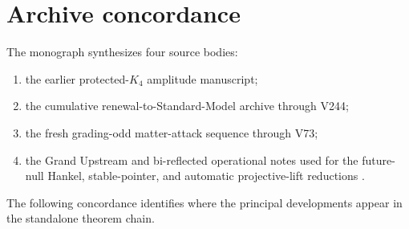 \documentclass[11pt,oneside,openany]{book}
\numberwithin{equation}{chapter}
\theoremstyle{definition}
\theoremstyle{remark}
\begin{document}
\chapter{Archive concordance}
\label{app:concordance}

The monograph synthesizes four source bodies:

\begin{enumerate}[label=\textup{(\roman*)},leftmargin=2.2em]
\item the earlier protected-\(K_4\) amplitude manuscript;
\item the cumulative renewal-to-Standard-Model archive through V244;
\item the fresh grading-odd matter-attack sequence through V73;
\item the Grand Upstream and bi-reflected operational notes used for the
      future-null Hankel, stable-pointer, and automatic projective-lift
      reductions \cite{PelissierMatterAttackV73,GrandUpstreamV045,UniversalPortV044}.
\end{enumerate}

The following concordance identifies where the principal developments appear
in the standalone theorem chain.
\end{document}
